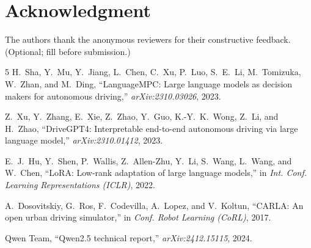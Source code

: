\documentclass[conference]{IEEEtran}
\begin{document}
\section*{Acknowledgment}
The authors thank the anonymous reviewers for their constructive feedback.
(Optional; fill before submission.)

\begin{thebibliography}{5}
H.~Sha, Y.~Mu, Y.~Jiang, L.~Chen, C.~Xu, P.~Luo, S.~E.~Li, M.~Tomizuka,
W.~Zhan, and M.~Ding, ``LanguageMPC: Large language models as decision makers
for autonomous driving,'' \emph{arXiv:2310.03026}, 2023.

Z.~Xu, Y.~Zhang, E.~Xie, Z.~Zhao, Y.~Guo, K.-Y.~K.~Wong, Z.~Li, and H.~Zhao,
``DriveGPT4: Interpretable end-to-end autonomous driving via large language
model,'' \emph{arXiv:2310.01412}, 2023.

E.~J.~Hu, Y.~Shen, P.~Wallis, Z.~Allen-Zhu, Y.~Li, S.~Wang, L.~Wang, and
W.~Chen, ``LoRA: Low-rank adaptation of large language models,'' in
\emph{Int. Conf. Learning Representations (ICLR)}, 2022.

A.~Dosovitskiy, G.~Ros, F.~Codevilla, A.~Lopez, and V.~Koltun, ``CARLA: An open
urban driving simulator,'' in \emph{Conf. Robot Learning (CoRL)}, 2017.

Qwen Team, ``Qwen2.5 technical report,'' \emph{arXiv:2412.15115}, 2024.
\end{thebibliography}
\end{document}
